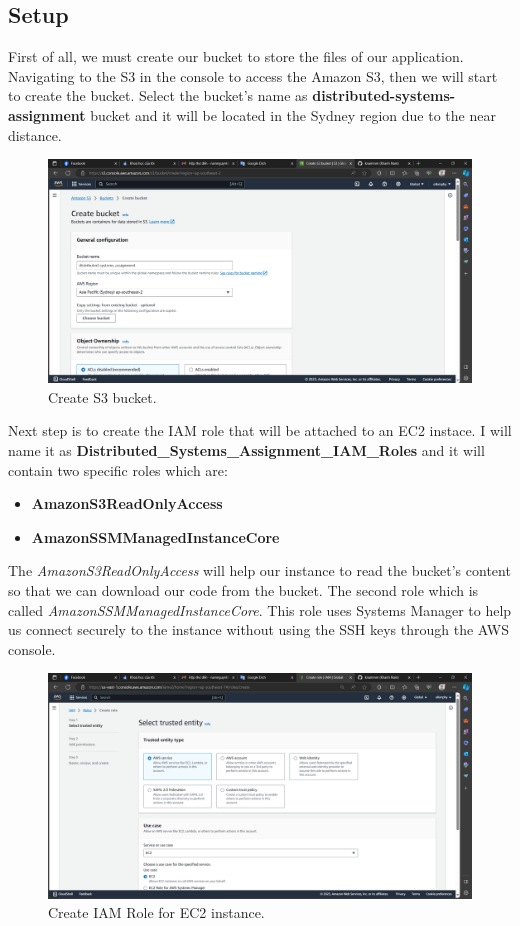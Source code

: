 \documentclass{article}
\begin{document}
\subsection{Setup}
First of all, we must create our bucket to store the files of our application. Navigating to the S3 in the console to access the Amazon S3, then we will start to create the bucket. Select the bucket's name as \textbf{distributed-systems-assignment} bucket and it will be located in the Sydney region due to the near distance.\par
\begin{figure}[h]
    \centering
    \includegraphics[width=12cm]{Pictures/Set up/S3-create.png}
    \caption{Create S3 bucket.}
    \label{fig:enter-label}
\end{figure}
Next step is to create the IAM role that will be attached to an EC2 instace. I will name it as \textbf{Distributed\_Systems\_Assignment\_IAM\_Roles} and it will contain two specific roles which are:
\begin{itemize}
    \item \textbf{AmazonS3ReadOnlyAccess}
    \item \textbf{AmazonSSMManagedInstanceCore}
\end{itemize}
\vspace{10pt}
The \textit{AmazonS3ReadOnlyAccess} will help our instance to read the bucket's content so that we can download our code from the bucket. The second role which is called \textit{AmazonSSMManagedInstanceCore}. This role uses Systems Manager to help us connect securely to the instance without using the SSH keys through the AWS console.\par
\begin{figure}[h]
    \centering
    \includegraphics[width=12cm]{Pictures/Set up/IAM_Role_1.png}
    \caption{Create IAM Role for EC2 instance.}
    \label{fig:enter-label}
\end{figure}
\end{document}

